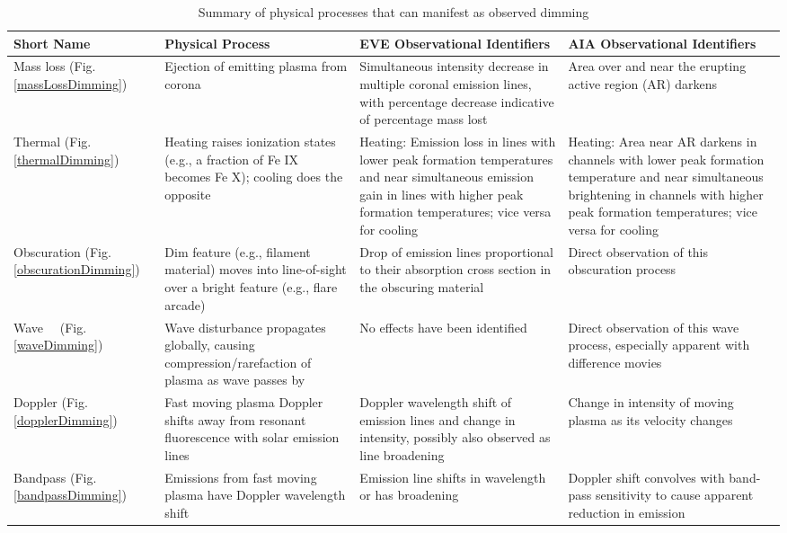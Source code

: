 \begin{table}[!t]
    \caption{Summary of physical processes that can manifest as observed dimming}
    \begin{center}
    \begin{tabular}{|p{1.9cm}|p{4cm}|p{4cm}|p{4cm}|} \hline
	Short Name & Physical Process & EVE Observational Identifiers & AIA Observational Identifiers \\ \hline \hline
	
	Mass loss (Fig. \ref{massLossDimming}) & Ejection of emitting plasma from corona & Simultaneous intensity decrease in multiple coronal emission lines, with percentage decrease indicative of percentage mass lost & Area over and near the erupting active region (AR) darkens \\ \hline
	
	Thermal (Fig. \ref{thermalDimming}) & Heating raises ionization states (e.g., a fraction of Fe IX becomes Fe X); cooling does the opposite & Heating: Emission loss in lines with lower peak formation temperatures and near simultaneous emission gain in lines with higher peak formation temperatures; vice versa for cooling & Heating: Area near AR darkens in channels with lower peak formation temperature and near simultaneous brightening in channels with higher peak formation temperatures; vice versa for cooling \\ \hline
	
	Obscuration (Fig. \ref{obscurationDimming}) & Dim feature (e.g., filament material) moves into line-of-sight over a bright feature (e.g., flare arcade) & Drop of emission lines proportional to their absorption cross section in the obscuring material & Direct observation of this obscuration process \\ \hline
	
	Wave \ \ (Fig. \ref{waveDimming}) & Wave disturbance propagates globally, causing compression/rarefaction of plasma as wave passes by & No effects have been identified & Direct observation of this wave process, especially apparent with difference movies \\ \hline
	
	Doppler (Fig. \ref{dopplerDimming}) & Fast moving plasma Doppler shifts away from resonant fluorescence with solar emission lines & Doppler wavelength shift of emission lines and change in intensity, possibly also observed as line broadening & Change in intensity of moving plasma as its velocity changes \\ \hline
	
	Bandpass (Fig. \ref{bandpassDimming}) & Emissions from fast moving plasma have Doppler wavelength shift & Emission line shifts in wavelength or has broadening & Doppler shift convolves with band-pass sensitivity to cause apparent reduction in emission \\ \hline
	
	\end{tabular}
    \\ \rule{0mm}{5mm}
    \end{center}
    \label{tablesummary}
\end{table}

